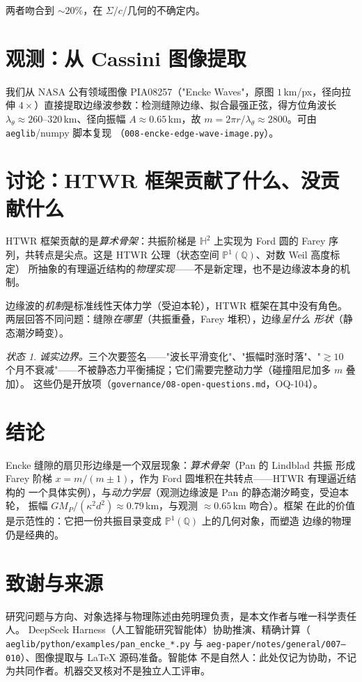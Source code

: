 \documentclass[11pt]{ctexart}
\theoremstyle{remark}
\newtheorem*{status}{状态}
\newcommand{\Q}{\mathbb{Q}}
\newcommand{\PP}{\mathbb{P}}
\newcommand{\Ht}{\mathbb{H}}
\begin{document}
两者吻合到 $\sim20\%$，在 $\Sigma/c$/几何的不确定内。

\section{观测：从 Cassini 图像提取}\label{sec:image}

我们从 NASA 公有领域图像 PIA08257（"Encke Waves"，原图 $1$\,km/px，径向拉伸
$4\times$）直接提取边缘波参数：检测缝隙边缘、拟合最强正弦，得方位角波长
$\lambda_\theta\approx260$--$320$\,km、径向振幅 $A\approx0.65$\,km，故
$m=2\pi r/\lambda_\theta\approx2800$。可由 \texttt{aeglib}/numpy 脚本复现
（\texttt{008-encke-edge-wave-image.py}）。

\section{讨论：HTWR 框架贡献了什么、没贡献什么}\label{sec:discussion}

HTWR 框架贡献的是\emph{算术骨架}：共振阶梯是 $\Ht^2$ 上实现为 Ford 圆的 Farey
序列，共转点是尖点。这是 HTWR 公理（状态空间 $\PP^1(\Q)$、对数 Weil 高度标定）
所抽象的有理逼近结构的\emph{物理实现}——不是新定理，也不是边缘波本身的机制。

边缘波的\emph{机制}是标准线性天体力学（受迫本轮），HTWR 框架在其中没有角色。
两层回答不同问题：缝隙\emph{在哪里}（共振重叠，Farey 堆积），边缘\emph{呈什么
形状}（静态潮汐畸变）。

\begin{status}
\emph{诚实边界。}三个次要签名——"波长平滑变化"、"振幅时涨时落"、"$\gtrsim10$
个月不衰减"——不被静态力平衡捕捉；它们需要完整动力学（碰撞阻尼加多 $m$ 叠加）。
这些仍是开放项（\texttt{governance/08-open-questions.md}，OQ-104）。
\end{status}

\section{结论}\label{sec:conclusion}

Encke 缝隙的扇贝形边缘是一个双层现象：\emph{算术骨架}（Pan 的 Lindblad 共振
形成 Farey 阶梯 $x=m/(m\pm1)$，作为 Ford 圆堆积在共转点——HTWR 有理逼近结构的
一个具体实例），与\emph{动力学层}（观测边缘波是 Pan 的静态潮汐畸变，受迫本轮，
振幅 $GM_P/(\kappa^2d^2)\approx0.79$\,km，与观测 $\approx0.65$\,km 吻合）。框架
在此的价值是示范性的：它把一份共振目录变成 $\PP^1(\Q)$ 上的几何对象，而塑造
边缘的物理仍是经典的。

\section*{致谢与来源}
研究问题与方向、对象选择与物理陈述由苑明理负责，是本文作者与唯一科学责任人。
DeepSeek Harness（人工智能研究智能体）协助推演、精确计算（
\texttt{aeglib/python/examples/pan\_encke\_*.py} 与
\texttt{aeg-paper/notes/general/007--010}）、图像提取与 \LaTeX{} 源码准备。智能体
不是自然人：此处仅记为协助，不记为共同作者。机器交叉核对不是独立人工评审。
\end{document}
